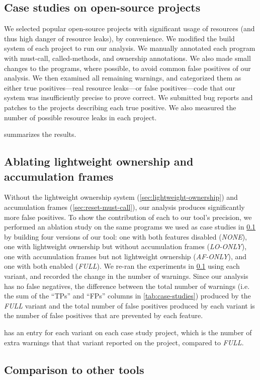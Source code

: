 \subsection{Case studies on open-source projects}
\label{sec:case-studies}

We selected  popular open-source projects with significant
usage of resources (and thus high danger of resource leaks), by
convenience.  We modified the build system of each project to run our
analysis. We manually annotated each program with must-call,
called-methods, and ownership annotations. We also
made small changes to the programs, where possible, to avoid
common false positives of our analysis. We then examined all
remaining warnings, and categorized them as either true
positives---real resource leaks---or false positives---code that our
system was insufficiently precise to prove correct. We submitted bug
reports and patches to the projects describing each true positive.
We also measured the number of possible resource leaks in each project.

 summarizes the results.


\subsection{Ablating lightweight ownership and accumulation frames}
\label{sec:ablation}

Without the lightweight ownership system (\cref{sec:lightweight-ownership}) and
accumulation frames (\cref{sec:reset-must-call}), our analysis produces significantly
more false positives. To show the contribution of each to our tool's precision,
we performed an ablation study on the same programs we used as case studies in
\cref{sec:case-studies} by building four versions of our tool: one with both
features disabled (\emph{NONE}), one with lightweight ownership but without
accumulation frames (\emph{LO-ONLY}), one with accumulation frames but not
lightweight ownership (\emph{AF-ONLY}), and one with both enabled (\emph{FULL}).
We re-ran the experiments in \cref{sec:case-studies} using each variant, and
recorded the change in the number of warnings. Since our analysis has no false
negatives, the difference between the total number of warnings (i.e. the sum of
the ``TPs'' and ``FPs'' columns in \cref{tab:case-studies}) produced by the \emph{FULL}
variant and the total number of false positives produced by each variant is
the number of false positives that are prevented by each feature.

 has an entry for each variant on each case study project,
which is the number of extra warnings that that variant reported on the project,
compared to \emph{FULL}.

\subsection{Comparison to other tools}
\label{sec:compare}
